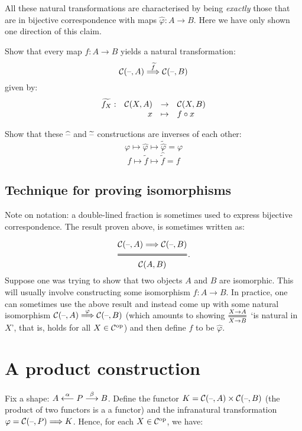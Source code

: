 All these natural transformations are characterised by being \textit{exactly}
those that are in bijective correspondence with maps
$\widehat{\varphi}: A \to B$. Here we have only shown one direction of this
claim.

\begin{exercise}
Show that every map $f: A \to B$ yields a natural transformation:
\[ \mathcal{C} (\text{--}, A) \overset{\widetilde{f}}{\Longrightarrow} \mathcal{C} (\text{--}, B) \]
given by:
\[ \begin{array}{crcl}
    \widetilde{f_X}: & \mathcal{C} (X, A) & \to & \mathcal{C} (X, B) \\
    & x & \mapsto & f \circ x
\end{array} \]
\end{exercise}

\begin{exercise}
Show that these $\widehat{\text{--}}$ and $\widetilde{\text{--}}$ constructions are
inverses of each other:
\[ \varphi \mapsto \widehat{\varphi} \mapsto \widetilde{\widehat{\varphi}} =
\varphi \]
\[ f \mapsto \widetilde{f} \mapsto \widehat{\widetilde{f}} = f \]
\end{exercise}

\subsection{Technique for proving isomorphisms}\label{subsec:proveiso}

Note on notation: a double-lined fraction is sometimes used to express
bijective correspondence. The result proven above, is sometimes written as:

\[ \Efrac{\lscat C (\phold, A) \natarrow \lscat C (\phold, B) }{ \lscat C(A, B) }.\]

Suppose one was trying to show that two objects $A$ and $B$ are isomorphic.
This will usually involve constructing some isomorphism $ f : A \to B $.  In
practice, one can sometimes use the above result and instead come up with some
natural isomorphism $\mathcal{C} (\text{--}, A) \overset{\varphi}{\Longrightarrow} \mathcal{C} (\text{--},
B)$ (which amounts to showing $ \Efrac{X \to A}{X \to B} $ `is natural in $X$',
that is, holds for all $X \in \mathcal{C}^{\mathrm{op}} $) and then define $f$ to be
$\widehat{\varphi}$.

\section{A product construction}

Fix a shape: $ A \overset{\alpha}{\longleftarrow} P \overset{\beta}{\longrightarrow} B $. 
Define the functor $ K = \mathcal{C} (\text{--}, A) \times \mathcal{C}
(\text{--}, B)$ (the product of two functors is a a functor) and the infranatural
transformation $\varphi = \mathcal{C} (\text{--}, P) \Longrightarrow K $. Hence, for each $X
\in \mathcal{C}^{\mathrm{op}} $, we have: 

